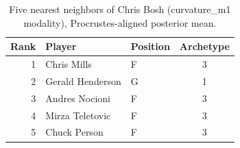 \begin{table}[htbp]
  \centering\small
  \begin{tabular}{rllc}
    \toprule
    Rank & Player & Position & Archetype \\
    \midrule
    1 & Chris Mills & F & 3 \\
    2 & Gerald Henderson & G & 1 \\
    3 & Andres Nocioni & F & 3 \\
    4 & Mirza Teletovic & F & 3 \\
    5 & Chuck Person & F & 3 \\
    \bottomrule
  \end{tabular}
  \caption{Five nearest neighbors of Chris Bosh (curvature_m1 modality), Procrustes-aligned posterior mean.}
  \label{tab:Chris_Bosh_neighbors_curvature_m1}
\end{table}

